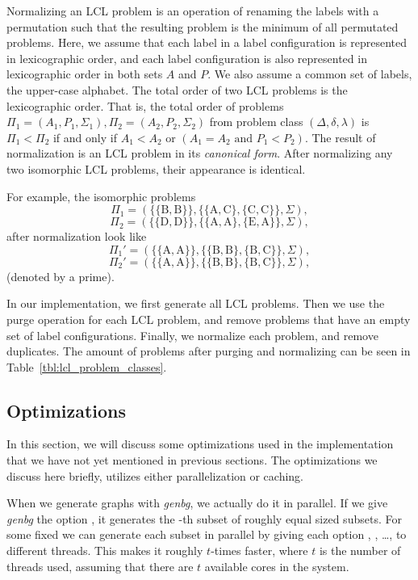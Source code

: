 Normalizing an LCL problem is an operation of renaming the labels with a permutation such that the resulting problem is the minimum of all permutated problems.
Here, we assume that each label in a label configuration is represented in lexicographic order, and each label configuration is also represented in lexicographic order in both sets $A$ and $P$.
We also assume a common set of labels, the upper-case alphabet.
The total order of two LCL problems is the lexicographic order.
That is, the total order of problems $\Pi_1=(A_1, P_1, \Sigma_1), \Pi_2=(A_2, P_2, \Sigma_2)$ from problem class $(\Delta, \delta, \lambda)$ is $\Pi_1 < \Pi_2$ if and only if $A_1 < A_2$ or $(A_1 = A_2 \text{ and } P_1 < P_2)$.
The result of normalization is an LCL problem in its \emph{canonical form}.
After normalizing any two isomorphic LCL problems, their appearance is identical.

For example, the isomorphic problems
$$\Pi_1=(\{\{\mathrm{B, B}\}\}, \{\{\mathrm{A, C}\}, \{\mathrm{C,C\}}\}, \Sigma),$$
$$\Pi_2=(\{\{\mathrm{D, D}\}\}, \{\{\mathrm{A,A\}},\{\mathrm{E, A}\}\}, \Sigma),$$ after normalization look like
$$\Pi_1'=(\{\{\mathrm{A, A}\}\}, \{\{\mathrm{B, B}\},\{\mathrm{B, C}\}\}, \Sigma),$$
$$\Pi_2'=(\{\{\mathrm{A, A}\}\}, \{\{\mathrm{B, B}\},\{\mathrm{B, C}\}\}, \Sigma),$$ (denoted by a prime).

In our implementation, we first generate all LCL problems.
Then we use the purge operation for each LCL problem, and remove problems that have an empty set of label configurations.
Finally, we normalize each problem, and remove duplicates.
The amount of problems after purging and normalizing can be seen in Table~\ref{tbl:lcl_problem_classes}.



\subsection{Optimizations} \label{sec:implementation:optimizations}
In this section, we will discuss some optimizations used in the implementation that we have not yet mentioned in previous sections.
The optimizations we discuss here briefly, utilizes either parallelization or caching.

When we generate graphs with \emph{genbg}, we actually do it in parallel.
If we give \emph{genbg} the option , it generates the -th subset of  roughly equal sized subsets.
For some fixed  we can generate each subset in parallel by giving each option , , \dots,  to different threads.
This makes it roughly $t$-times faster, where $t$ is the number of threads used, assuming that there are $t$ available cores in the system.

